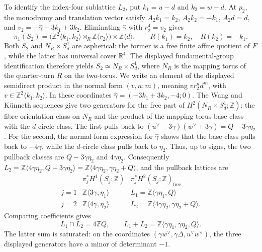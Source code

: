 To identify the index-four sublattice $L_2$, put
$k_1=u-d$ and $k_2=w-d$.  At $p_2$, the monodromy and translation
vector satisfy $A_2k_1=k_2$, $A_2k_2=-k_1$, $A_2d=d$, and
$v_2=-\widehat\gamma-3k_1+3k_2$.
Eliminating $\widehat\gamma$ with $r_2^4=v_2$ gives
\begin{equation}\label{eq:order-four-product-model}
 \pi_1(S_2)=
 \bigl(\mathbb Z^2\langle k_1,k_2\rangle
       \rtimes_R\mathbb Z\langle r_2\rangle\bigr)
 \times\mathbb Z\langle d\rangle,
 \qquad R(k_1)=k_2,\quad R(k_2)=-k_1.
\end{equation}
Both $S_2$ and $N_R\times S^1_d$ are aspherical: the former is a free
finite affine quotient of $F$, while the latter has universal cover
$\mathbb R^4$.  The displayed fundamental-group identification therefore
yields $S_2\simeq N_R\times S^1_d$, where $N_R$ is the mapping torus of
the quarter-turn $R$ on the two-torus.  We write an element of the displayed
semidirect product in the normal form $(v,n;m)$, meaning
$v r_2^n d^m$, with $v\in\mathbb Z^2\langle k_1,k_2\rangle$.
In these coordinates
$\widehat\gamma=(-3k_1+3k_2,-4;0)$.
The Wang and K\"unneth sequences give two generators for the free part of
$H^2(N_R\times S^1_d;\mathbb Z)$: the fibre-orientation class on $N_R$
and the product of the mapping-torus base class with the $d$-circle class.
The first pulls back to
$(u^\vee-3\gamma)(w^\vee+3\gamma)=Q-3\gamma\eta_2$.  For the second, the
normal-form expression for $\widehat\gamma$ shows that the base class pulls
back to $-4\gamma$, while the $d$-circle class pulls back to $\eta_2$.
Thus, up to signs, the two pullback classes are
$Q-3\gamma\eta_2$ and $4\gamma\eta_2$.
Consequently
$L_2=\mathbb Z\langle4\gamma\eta_2,Q-3\gamma\eta_2\rangle
=\mathbb Z\langle4\gamma\eta_2,\gamma\eta_2+Q\rangle$, and the pullback lattices are
\begin{equation*}
\begin{array}{c|c|c}
 &\pi_j^*H^1(S_j;\mathbb Z)
 &\pi_j^*H^2(S_j;\mathbb Z)_{\mathrm{free}}\\ \hline
j=1&\mathbb Z\langle3\gamma,\eta_1\rangle
   &L_1=\mathbb Z\langle \gamma\eta_1,Q\rangle\\
j=2&\mathbb Z\langle4\gamma,\eta_2\rangle
   &L_2=\mathbb Z\langle4\gamma\eta_2,\gamma\eta_2+Q\rangle.
\end{array}
\end{equation*}
Comparing coefficients gives
\begin{equation}\label{eq:finite-fibre-lattice-arithmetic}
 L_1\cap L_2=4\mathbb ZQ,
 \qquad
 L_1+L_2=\mathbb Z\langle\gamma\eta_1,\gamma\eta_2,Q\rangle.
\end{equation}
The latter sum is saturated: on the coordinates
$(\gamma w^\vee,\gamma\Delta,u^\vee w^\vee)$, the three displayed generators have a
minor of determinant $-1$.

